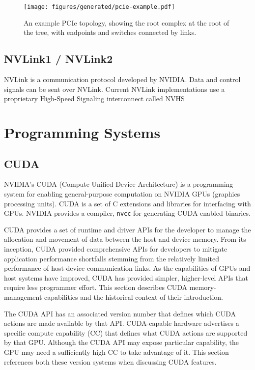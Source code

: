 \begin{figure}[ht]
    \centering
    \texttt{[image: figures/generated/pcie-example.pdf]}
    \caption[Example PCIe topology.]{An example PCIe topology, showing the root complex at the root of the tree, with endpoints and switches connected by links.}
    \label{fig:pcie-example}
\end{figure}

\subsection{NVLink1 / NVLink2}

NVLink is a communication protocol developed by NVIDIA.
Data and control signals can be sent over NVLink.
Current NVLink implementations use a proprietary High-Speed Signaling interconnect called NVHS \cite{harris2016insidepascal}




%
%
%
\section{Programming Systems}
\subsection{CUDA}
\label{sec:cuda}


NVIDIA's CUDA (Compute Unified Device Architecture) is a programming system for enabling general-purpose computation on NVIDIA GPUs (graphics processing units).
CUDA is a set of C extensions and libraries for interfacing with GPUs.
NVIDIA provides a compiler, \texttt{nvcc} for generating CUDA-enabled binaries.

CUDA provides a set of runtime and driver APIs for the developer to manage the allocation and movement of data between the host and device memory.
From its inception, CUDA provided comprehensive APIs for developers to mitigate application performance shortfalls stemming from the relatively limited performance of host-device communication links.
As the capabilities of GPUs and host systems have improved, CUDA has provided simpler, higher-level APIs that require less programmer effort.
This section describes CUDA memory-management capabilities and the historical context of their introduction.

The CUDA API has an associated version number that defines which CUDA actions are made available by that API.
CUDA-capable hardware advertises a specific compute capability (CC) that defines what CUDA actions are supported by that GPU.
Although the CUDA API may expose particular capability, the GPU may need a sufficiently high CC to take advantage of it.
This section references both these version systems when discussing CUDA features.


